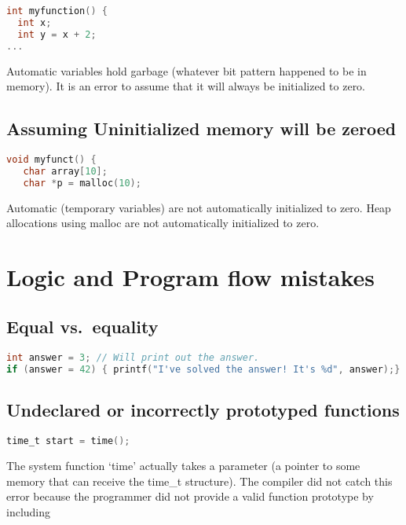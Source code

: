 \begin{lstlisting}[language=C]
int myfunction() {
  int x;
  int y = x + 2;
...
\end{lstlisting}

Automatic variables hold garbage (whatever bit pattern happened to be in
memory). It is an error to assume that it will always be initialized to
zero.

\subsection{Assuming Uninitialized memory will be zeroed}\label{assuming-uninitialized-memory-will-be-zeroed}

\begin{lstlisting}[language=C]
void myfunct() {
   char array[10];
   char *p = malloc(10);
\end{lstlisting}

Automatic (temporary variables) are not automatically initialized to zero. Heap allocations using malloc are not automatically initialized to zero.

\section{Logic and Program flow
mistakes}\label{logic-and-program-flow-mistakes}

\subsection{Equal vs.~equality}\label{equal-vs.equality}

\begin{lstlisting}[language=C]
int answer = 3; // Will print out the answer.
if (answer = 42) { printf("I've solved the answer! It's %d", answer);}
\end{lstlisting}

\subsection{Undeclared or incorrectly prototyped
functions}\label{undeclared-or-incorrectly-prototyped-functions}

\begin{lstlisting}[language=C]
time_t start = time();
\end{lstlisting}

The system function `time' actually takes a parameter (a pointer to some
memory that can receive the time\_t structure). The compiler did not
catch this error because the programmer did not provide a valid function
prototype by including 

